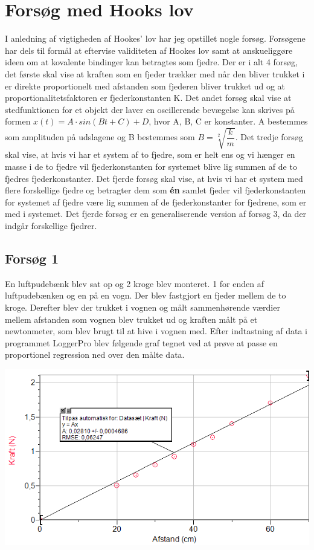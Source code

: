 \section{Forsøg med Hooks lov}
I anledning af vigtigheden af Hookes' lov har jeg opstillet nogle forsøg. Forsøgene har dels til formål at eftervise validiteten af Hookes lov samt at anskueliggøre ideen om at kovalente bindinger kan betragtes som fjedre. Der er i alt 4 forsøg, det første skal vise at kraften som en fjeder trækker med når den bliver trukket i er direkte proportionelt med afstanden som fjederen bliver trukket ud og at proportionalitetsfaktoren er fjederkonstanten K. Det andet forsøg skal vise at stedfunktionen for et objekt der laver en oscillerende bevægelse kan skrives på formen $x(t) = A \cdot sin(B t + C) + D$, hvor A, B, C er konstanter. A bestemmes som amplituden på udslagene og B bestemmes som $B=\sqrt[2]{\dfrac{k}{m}}$. Det tredje forsøg skal vise, at hvis vi har et system af to fjedre, som er helt ens og vi hænger en masse i de to fjedre vil fjederkonstanten for systemet blive lig summen af de to fjedres fjederkonstanter. Det fjerde forsøg skal vise, at hvis vi har et system med flere forskellige fjedre og betragter dem som \textbf{én} samlet fjeder vil fjederkonstanten for systemet af fjedre være lig summen af de fjederkonstanter for fjedrene, som er med i systemet. Det fjerde forsøg er en generaliserende version af forsøg 3, da der indgår forskellige fjedrer. 

\subsection{Forsøg 1}
En luftpudebænk blev sat op og 2 kroge blev monteret. 1 for enden af luftpudebænken og en på en vogn. Der blev fastgjort en fjeder mellem de to kroge. Derefter blev der trukket i vognen og målt sammenhørende værdier mellem afstanden som vognen blev trukket ud og kraften målt på et newtonmeter, som blev brugt til at hive i vognen med. Efter indtastning af data i programmet LoggerPro blev følgende graf tegnet ved at prøve at passe en proportionel regression ned over den målte data. 

\begin{center}
\includegraphics[scale=0.7]{Billeder/graf1}
\end{center}


